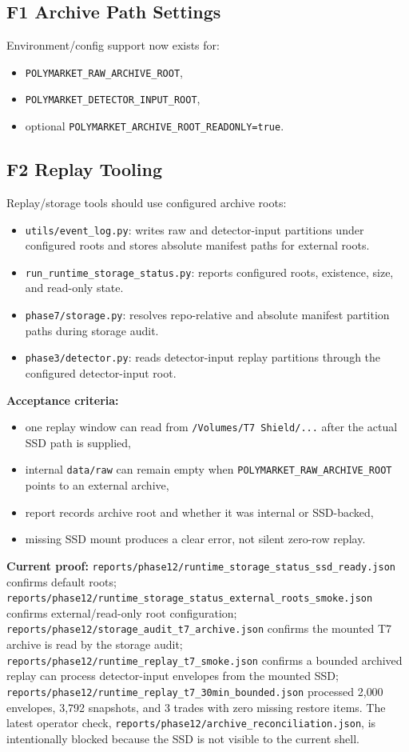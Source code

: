 \documentclass{article}
\begin{document}
\subsection*{F1 Archive Path Settings}
Environment/config support now exists for:
\begin{itemize}[nosep]
\item \texttt{POLYMARKET\_RAW\_ARCHIVE\_ROOT},
\item \texttt{POLYMARKET\_DETECTOR\_INPUT\_ROOT},
\item optional \texttt{POLYMARKET\_ARCHIVE\_ROOT\_READONLY=true}.
\end{itemize}

\subsection*{F2 Replay Tooling}
Replay/storage tools should use configured archive roots:
\begin{itemize}[nosep]
\item \texttt{utils/event\_log.py}: writes raw and detector-input partitions under configured roots and stores absolute manifest paths for external roots.
\item \texttt{run\_runtime\_storage\_status.py}: reports configured roots, existence, size, and read-only state.
\item \texttt{phase7/storage.py}: resolves repo-relative and absolute manifest partition paths during storage audit.
\item \texttt{phase3/detector.py}: reads detector-input replay partitions through the configured detector-input root.
\end{itemize}

\textbf{Acceptance criteria:}
\begin{itemize}[nosep]
\item one replay window can read from \texttt{/Volumes/T7 Shield/...} after the actual SSD path is supplied,
\item internal \texttt{data/raw} can remain empty when \texttt{POLYMARKET\_RAW\_ARCHIVE\_ROOT} points to an external archive,
\item report records archive root and whether it was internal or SSD-backed,
\item missing SSD mount produces a clear error, not silent zero-row replay.
\end{itemize}

\textbf{Current proof:} \texttt{reports/phase12/runtime\_storage\_status\_ssd\_ready.json} confirms default roots; \texttt{reports/phase12/runtime\_storage\_status\_external\_roots\_smoke.json} confirms external/read-only root configuration; \texttt{reports/phase12/storage\_audit\_t7\_archive.json} confirms the mounted T7 archive is read by the storage audit; \texttt{reports/phase12/runtime\_replay\_t7\_smoke.json} confirms a bounded archived replay can process detector-input envelopes from the mounted SSD; \texttt{reports/phase12/runtime\_replay\_t7\_30min\_bounded.json} processed 2{,}000 envelopes, 3{,}792 snapshots, and 3 trades with zero missing restore items. The latest operator check, \texttt{reports/phase12/archive\_reconciliation.json}, is intentionally blocked because the SSD is not visible to the current shell.
\end{document}
